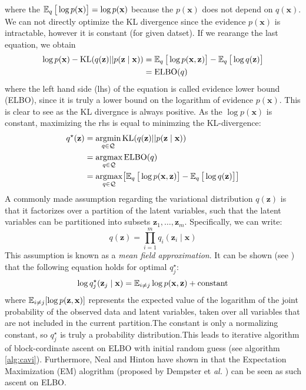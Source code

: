 where the $\operatorname{\mathbb{E}}_q \big[\log p(\mathbf{x})\big] = \log p(\mathbf{x})$ because the $p(\mathbf{x})$ does not depend on $q(\mathbf{x})$. 
We can not directly optimize the KL divergence since the evidence $p(\mathbf{x})$ is intractable, however it is constant (for given datset).
If we rearange the last equation, we obtain 
\begin{align}
\label{eq:elbo}
\log p(\mathbf{x}) - \mathrm{KL}(q(\mathbf{z}) || p(\mathbf{z} \mid  \mathbf{x})) &= \operatorname{\mathbb{E}}_q \big[\log p(\mathbf{x},\mathbf{z})\big] - \operatorname{\mathbb{E}}_q \big[\log q(\mathbf{z})\big] \\
    &= \mathrm{ELBO}(q) 
\end{align}
where the left hand side (lhs) of the equation is called evidence lower bound (ELBO), since it is truly a lower bound on the logarithm of evidence 
$p(\mathbf{x})$. This is clear to see as the KL divergnce is always positive. As the $\log p(\mathbf{x})$ is constant, maximizing the rhs is 
equal to minimzing the KL-divergence:
\begin{align*} 
    q^\star(\mathbf{z}) &= \mathop{\rm argmin}_{q \in \mathcal{Q}} \mathrm{KL}(q(\mathbf{z}) || p(\mathbf{z} \mid  \mathbf{x})) \\
                        &= \mathop{\rm argmax}_{q \in \mathcal{Q}} \mathrm{ELBO}(q) \\
                        &= \mathop{\rm argmax}_{q \in \mathcal{Q}} \bigl[ \operatorname{\mathbb{E}}_q \big[\log p(\mathbf{x},\mathbf{z})\big] - \operatorname{\mathbb{E}}_q \big[\log q(\mathbf{z})\big] \bigr]  \\
\end{align*}
A commonly made assumption regarding the variational distribution $q(\mathbf{z})$ is that it factorizes over a partition of the latent variables, 
such that the latent variables can be partitioned into subsets $\mathbf{z}_1,\dots,\mathbf{z}_m$. Specifically, we can write:
$$
q(\mathbf{z}) = \prod_{i=1}^m q_i(\mathbf{z}_i\mid \mathbf{x})
$$
This assumption is known as a \textit{mean field approximation}. It can be shown (see \cite{intro-variational-blog-2019}) that the following 
equation holds for optimal $q^\star_j$: 
$$
\log q^\star_j(\mathbf{z}_j\mid \mathbf{x}) = \operatorname{\mathbb{E}}_{i \neq j} \log p(\mathbf{x},\mathbf{z}) + \text{constant}
$$
where $\operatorname{\mathbb{E}}_{{i\neq j}}[\log p({\mathbf {z}},{\mathbf {x}})]$ represents the expected value of the logarithm of the joint probability 
of the observed data and latent variables, taken over all variables that are not included in the current partition.The constant is 
only a normalizing constant, so $q^\star_j$ is truly a probability distribution.This leads to iterative 
algorithm of block-cordinate ascent on ELBO with initial random guess (see algorithm \ref{alg:cavi}). Furthermore, Neal and Hinton
have shown in \cite{em-as-vb-1998} that the Expectation Maximization (EM) alogrithm (proposed by Dempster et \textit{al.} \cite{em-alg-1977}) 
can be seen as such ascent on ELBO. 

